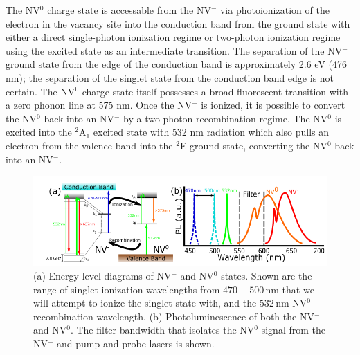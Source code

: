 \documentclass[11pt]{article}
\newcommand{\unit}[1]{\ensuremath{\, \mathrm{#1}}}
\begin{document}
The NV$^0$ charge state is accessable from the NV$^-$ via photoionization of the electron in the vacancy site into the conduction band from the ground state with either a direct single-photon ionization regime or two-photon ionization regime using the excited state as an intermediate transition.  The separation of the NV$^-$ ground state from the edge of the conduction band is approximately 2.6 eV (476 nm); the separation of the singlet state from the conduction band edge is not certain.  The NV$^0$ charge state itself possesses a broad fluorescent transition with a zero phonon line at 575 nm.  Once the NV$^-$ is ionized, it is possible to convert the NV$^0$ back into an NV$^-$ by a two-photon recombination regime.  The NV$^0$ is excited into the $^2$A$_1$ excited state with 532 nm radiation which also pulls an electron from the valence band into the $^2$E ground state, converting the NV$^0$ back into an NV$^-$.

\begin{figure}
\centering
\includegraphics[width=1.0\textwidth]{Figures/IonizationEnergyandFilter.png}
\caption{(a) Energy level diagrams of NV$^-$ and NV$^0$ states. Shown are the range of singlet ionization wavelengths from $470-500\unit{nm}$ that we will attempt to ionize the singlet state with, and the $532\unit{nm}$ NV$^0$ recombination wavelength. (b) Photoluminescence of both the NV$^-$ and NV$^0$. The filter bandwidth that isolates the NV$^0$ signal from the NV$^-$ and pump and probe lasers is shown.}
\label{IonizationEnergyandFilterFig}
\end{figure}
\end{document}
